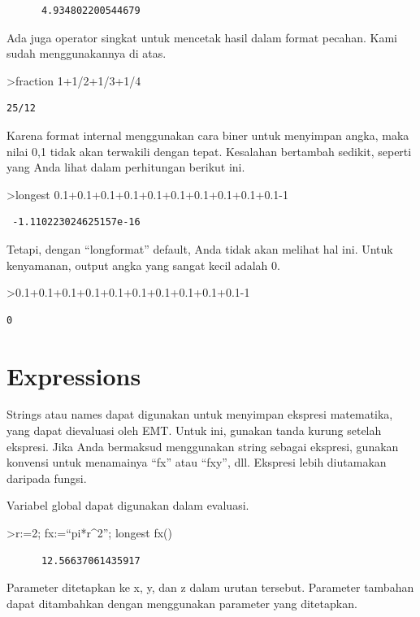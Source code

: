 \documentclass[
]{book}
\begin{document}
\begin{verbatim}
      4.934802200544679 
\end{verbatim}

Ada juga operator singkat untuk mencetak hasil dalam format pecahan. Kami sudah menggunakannya di atas.

\textgreater fraction 1+1/2+1/3+1/4

\begin{verbatim}
25/12
\end{verbatim}

Karena format internal menggunakan cara biner untuk menyimpan angka, maka nilai 0,1 tidak akan terwakili dengan tepat. Kesalahan bertambah sedikit, seperti yang Anda lihat dalam perhitungan berikut ini.

\textgreater longest 0.1+0.1+0.1+0.1+0.1+0.1+0.1+0.1+0.1+0.1-1

\begin{verbatim}
 -1.110223024625157e-16 
\end{verbatim}

Tetapi, dengan ``longformat'' default, Anda tidak akan melihat hal ini. Untuk kenyamanan, output angka yang sangat kecil adalah 0.

\textgreater0.1+0.1+0.1+0.1+0.1+0.1+0.1+0.1+0.1+0.1-1

\begin{verbatim}
0
\end{verbatim}

\section{Expressions}\label{expressions}

Strings atau names dapat digunakan untuk menyimpan ekspresi matematika, yang dapat dievaluasi oleh EMT. Untuk ini, gunakan tanda kurung setelah ekspresi. Jika Anda bermaksud menggunakan string sebagai ekspresi, gunakan konvensi untuk menamainya ``fx'' atau ``fxy'', dll. Ekspresi lebih diutamakan daripada fungsi.

Variabel global dapat digunakan dalam evaluasi.

\textgreater r:=2; fx:=``pi*r\^{}2''; longest fx()

\begin{verbatim}
      12.56637061435917 
\end{verbatim}

Parameter ditetapkan ke x, y, dan z dalam urutan tersebut. Parameter tambahan dapat ditambahkan dengan menggunakan parameter yang ditetapkan.
\end{document}
